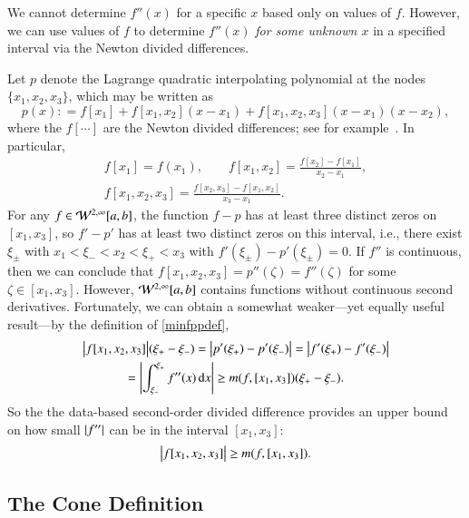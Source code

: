 \documentclass[review]{elsarticle}
\theoremstyle{definition}
\begin{document}
We cannot determine $f''(x)$ for a specific $x$ based only on values of $f$. However,
we can use values of $f$ to determine $f''(x)$ \emph{for some unknown $x$} in a
specified interval via the Newton divided differences.


Let $p$ denote the Lagrange quadratic interpolating polynomial at the nodes
$\{x_1, x_2, x_3\}$, which may be written as
\begin{equation*}
p(x) : = f[x_1] + f[x_1, x_2](x-x_1) + f[x_1, x_2, x_3](x-x_1)(x-x_2), 
\end{equation*}
where the $f[\cdots]$ are the Newton divided differences; see for example~\cite{CheKin12a}. In particular,
\begin{gather} 
\nonumber
f[x_1] = f(x_1), \qquad f[x_1, x_2] = \frac{f[x_2] - f[x_1]}{x_2-x_1},  \\
f[x_1, x_2,x_3] = \frac{f[x_2,x_3] - f[x_1,x_2]}{x_3-x_1}. \label{divdiff}
\end{gather}
For any $f \in
\mathcal{W}^{2,\infty}[a,b]$, the function $f - p$ has at least three distinct zeros on
$[x_1, x_3]$, so $f' - p'$ has at least two distinct zeros on this interval,
i.e., there exist $\xi_\pm$ with $x_1 < \xi_- < x_2 < \xi_+ < x_3$ with
$f'(\xi_\pm) - p'(\xi_{\pm}) = 0$. If $f''$ is continuous, then we can conclude
that $ f[x_1, x_2, x_3]= p''(\zeta) =f''(\zeta) $ for some $\zeta \in [x_1,
x_3]$. However, $\mathcal{W}^{2,\infty}[a,b]$ contains functions without continuous
second derivatives. Fortunately, we can obtain a somewhat weaker---yet equally useful result---by the definition of \eqref{minfppdef},
\begin{multline*}
\bigl \lvert f[x_1, x_2, x_3] \bigr \rvert(\xi_+  - \xi_-) = \left \lvert p'(\xi_+) - p'(\xi_-) \right \rvert =  \left \lvert f'(\xi_+) - f'(\xi_-) \right \rvert \\
= \left \lvert \int_{\xi_-}^{\xi_+} f''(x) \, {\rm d} x \right \rvert \ge m(f,[x_1, x_3]) (\xi_+  - \xi_-).
\end{multline*}
So the the data-based second-order divided difference provides an upper
bound on how small $\left \lvert f'' \right \rvert$ can be in the interval $[x_1, x_3]$:
\begin{equation}
\bigl \lvert f[x_1, x_2, x_3] \bigr \rvert \ge m(f,[x_1, x_3]).
\end{equation}

\subsection{The Cone Definition}  \label{sec:conedef}
\end{document}
